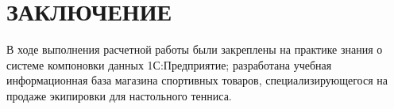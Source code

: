 \section*{ЗАКЛЮЧЕНИЕ}

В ходе выполнения расчетной работы были закреплены на практике знания
о системе компоновки данных 1С:Предприятие;
разработана учебная информационная база магазина спортивных товаров,
специализирующегося на продаже экипировки для настольного тенниса.